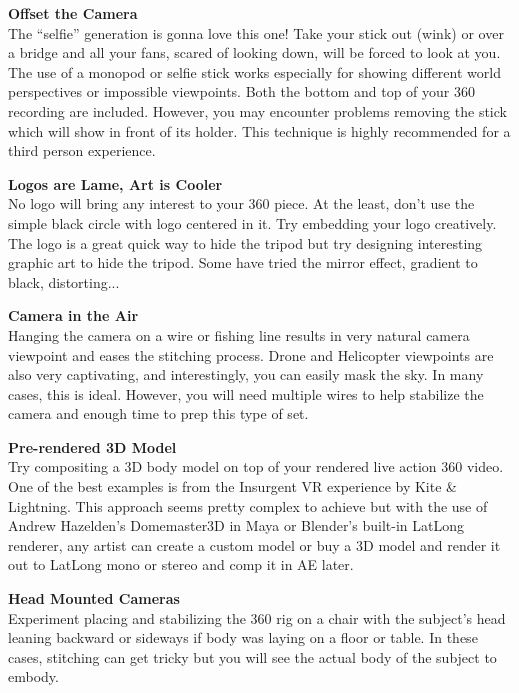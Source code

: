 \begin{fullwidth}

{\bfseries Offset the Camera}
\\
The “selfie” generation is gonna love this one! Take your stick out (wink) or over a bridge and all your fans, scared of looking down, will be forced to look at you. The use of a monopod or selfie stick works especially for showing different world perspectives or impossible viewpoints. Both the bottom and top of your 360 recording are included. However, you may encounter problems removing the stick which will show in front of its holder. This technique is highly recommended for a third person experience.


{\bfseries Logos are Lame, Art is Cooler}
\\
No logo will bring any interest to your 360 piece. At the least, don’t use the simple black circle with logo centered in it. Try embedding your logo creatively. The logo is a great quick way to hide the tripod but try designing interesting graphic art to hide the tripod. Some have tried the mirror effect, gradient to black, distorting... 

\clearpage
{\bfseries Camera in the Air}
\\
Hanging the camera on a wire or fishing line results in very natural camera viewpoint and eases the stitching process. Drone and Helicopter viewpoints are also very captivating, and interestingly, you can easily mask the sky. In many cases, this is ideal. However, you will need multiple wires to help stabilize the camera and enough time to prep this type of set.


{\bfseries Pre-rendered 3D Model}
\\
Try compositing a 3D body model on top of your rendered live action 360 video. One of the best examples is from the Insurgent VR experience by Kite & Lightning. This approach seems pretty complex to achieve but with the use of Andrew Hazelden's Domemaster3D in Maya or Blender's built-in LatLong renderer, any artist can create a custom model or buy a 3D model and render it out to LatLong mono or stereo and comp it in AE later.

\clearpage
{\bfseries Head Mounted Cameras}
\\
Experiment placing and stabilizing the 360 rig on a chair with the subject’s head leaning backward or sideways if body was laying on a floor or table. In these cases, stitching can get tricky but you will see the actual body of the subject to embody.


\end{fullwidth}
